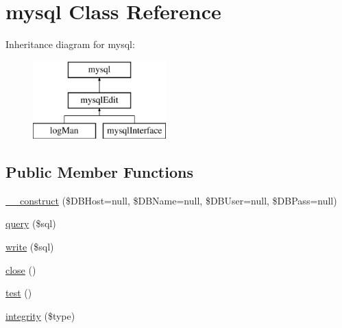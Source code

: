 \hypertarget{classmysql}{\section{mysql Class Reference}
\label{classmysql}
}
Inheritance diagram for mysql\-:\begin{figure}[H]
\begin{center}
\leavevmode
\includegraphics[height=3.000000cm]{classmysql}
\end{center}
\end{figure}
\subsection*{Public Member Functions}
\begin{DoxyCompactItemize}
\item 
\hyperlink{classmysql_a7af15455307c9b6a6c4d51d620014e7d}{\-\_\-\-\_\-construct} (\$D\-B\-Host=null, \$D\-B\-Name=null, \$D\-B\-User=null, \$D\-B\-Pass=null)
\item 
\hyperlink{classmysql_a6b251c8058230359b2922377699c4f29}{query} (\$sql)
\item 
\hyperlink{classmysql_a5c41f7192b0b3b866e15f56c431ddc36}{write} (\$sql)
\item 
\hyperlink{classmysql_aa69c8bf1f1dcf4e72552efff1fe3e87e}{close} ()
\item 
\hyperlink{classmysql_ad69dd4607977cae05ebe19d1ae604fb1}{test} ()
\item 
\hyperlink{classmysql_a2ddd43b5dd962bf0e23e9ce19e549ff3}{integrity} (\$type)
\end{DoxyCompactItemize}
